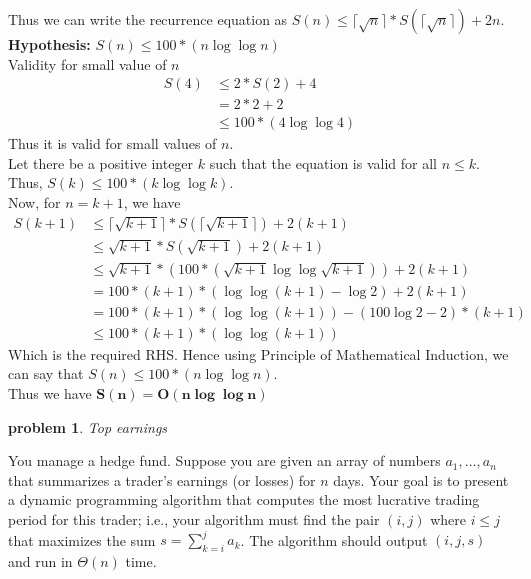 \documentclass[11pt]{article}
\newtheorem{problem}{\sc\color{cit}problem}
\begin{document}
\begin{enumerate}
    Thus we can write the recurrence equation as $S(n) \leq \lceil\sqrt{n}\rceil*S(\lceil\sqrt{n}\rceil)+2n$.\\
    \textbf{Hypothesis:} $S(n) \leq 100*(n\log\log n)$\\
    Validity for small value of $n$
    \begin{equation}
        \begin{split}
           S(4) &\leq 2*S(2)+4\\
           &= 2*2+2\\
           &\leq 100*(4 \log\log 4)
        \end{split}
    \end{equation}
    Thus it is valid for small values of $n$.\\
    Let there be a positive integer $k$ such that the equation is valid for all $n \leq k$.\\
    Thus, $S(k) \leq 100*(k\log\log k)$.\\
    \noindent Now, for $n=k+1$, we have
    \begin{equation}
    \begin{split}
       S(k+1) &\leq \lceil\sqrt{k+1}\rceil*S(\lceil\sqrt{k+1}\rceil)+2(k+1)\\
              &\leq \sqrt{k+1}*S(\sqrt{k+1})+2(k+1)\\
              &\leq \sqrt{k+1}*(100*(\sqrt{k+1}\log\log \sqrt{k+1}))+2(k+1)\\
              &= 100*(k+1)*(\log\log (k+1)- \log 2)+2(k+1)\\
              &= 100*(k+1)*(\log\log (k+1))- (100\log 2-2)*(k+1)\\
              &\leq 100*(k+1)*(\log\log (k+1))
    \end{split}
\end{equation}
    Which is the required RHS. Hence using Principle of Mathematical Induction, we can say that $S(n) \leq 100*(n\log\log n)$.\\
    Thus we have $\mathbf{S(n) = O(n\log\log n)}$
    
\end{enumerate}
\newpage    

\begin{problem}Top earnings\end{problem}
You manage a hedge fund.  Suppose you are given an array of numbers $a_1,\ldots,a_n$ that summarizes a trader's earnings (or losses)  for $n$ days. 
Your goal is to present a dynamic programming algorithm that computes the most lucrative trading period for this trader; i.e., your algorithm must find the pair $(i,j)$ where $i\leq j$ that maximizes the sum $s=\sum_{k=i}^j a_k$.  The algorithm should output $(i,j,s)$ and run in $\Theta(n)$ time.
\end{document}
